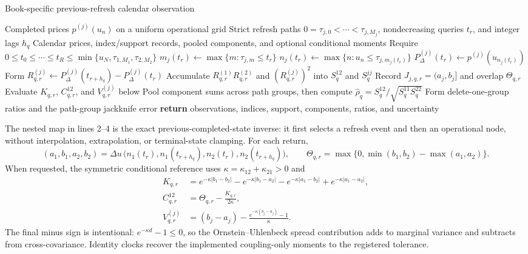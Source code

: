 \begin{algorithm}[H]
\caption{Book-specific previous-refresh calendar observation}
\label{alg:previous-refresh-observation}
\begin{algorithmic}[1]
\Require Completed prices $p^{(j)}(u_n)$ on a uniform operational grid
\Require Strict refresh paths $0=\tau_{j,0}<\cdots<\tau_{j,M_j}$,
nondecreasing queries $t_r$, and integer lags $h_q$
\Ensure Calendar prices, index/support records, pooled components, and
optional conditional moments
\State Require $0\leq t_0\leq\cdots\leq t_R\leq
\min\{u_N,\tau_{1,M_1},\tau_{2,M_2}\}$
  \State $m_j(t_r)\gets\max\{m:\tau_{j,m}\leq t_r\}$
  \State $n_j(t_r)\gets\max\{n:u_n\leq\tau_{j,m_j(t_r)}\}$
  \State $P_\Delta^{(j)}(t_r)\gets p^{(j)}(u_{n_j(t_r)})$
\EndFor
{}
  \State Form $R_{q,r}^{(j)}\gets
  P_\Delta^{(j)}(t_{r+h_q})-P_\Delta^{(j)}(t_r)$
  \State Accumulate $R_{q,r}^{(1)}R_{q,r}^{(2)}$ and
  $(R_{q,r}^{(j)})^2$ into $S_q^{12}$ and $S_q^{jj}$
  \State Record $J_{j,q,r}=(a_j,b_j]$ and overlap $\Theta_{q,r}$
    \State Evaluate $K_{q,r}$, $C_{q,r}^{12}$, and $V_{q,r}^{(j)}$ below
  \EndIf
\EndFor
\State Pool component sums across path groups, then compute
$\widehat\rho_q=S_q^{12}/\sqrt{S_q^{11}S_q^{22}}$
\State Form delete-one-group ratios and the path-group jackknife error
\State \textbf{return} observations, indices, support, components, ratios,
and uncertainty
\end{algorithmic}
\end{algorithm}

The nested map in lines 2--4 is the exact previous-completed-state inverse: it
first selects a refresh event and then an operational node, without
interpolation, extrapolation, or terminal-state clamping.  For each return,
\begin{equation}
(a_1,b_1,a_2,b_2)=\Delta u\,
\bigl(n_1(t_r),n_1(t_{r+h_q}),n_2(t_r),n_2(t_{r+h_q})\bigr),
\qquad
\Theta_{q,r}=\max\{0,\min(b_1,b_2)-\max(a_1,a_2)\}.
\end{equation}
When requested, the symmetric conditional reference uses
$\kappa=\kappa_{12}+\kappa_{21}>0$ and
\begin{align}
K_{q,r}&=e^{-\kappa|b_1-b_2|}-e^{-\kappa|b_1-a_2|}
-e^{-\kappa|a_1-b_2|}+e^{-\kappa|a_1-a_2|},\\
C_{q,r}^{12}&=\Theta_{q,r}-\frac{K_{q,r}}{2\kappa},
\label{eq:algorithm-conditional-cross}\\
V_{q,r}^{(j)}&=(b_j-a_j)
-\frac{e^{-\kappa(b_j-a_j)}-1}{\kappa}.
\label{eq:algorithm-conditional-variance}
\end{align}
The final minus sign is intentional: $e^{-\kappa d}-1\leq0$, so the
Ornstein--Uhlenbeck spread contribution adds to marginal variance and subtracts
from cross-covariance.  Identity clocks recover the implemented coupling-only
moments to the registered tolerance.


